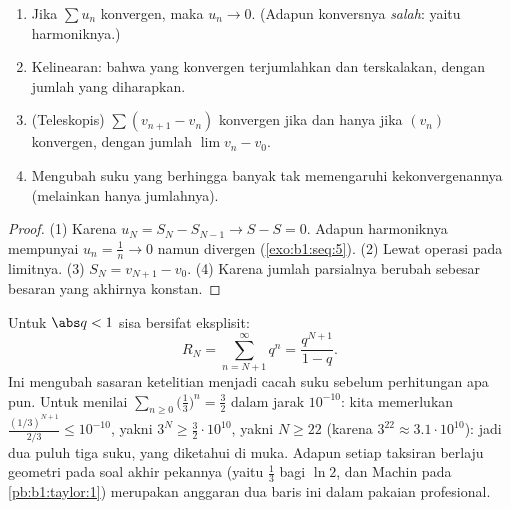 \begin{proposition}\label{prop:b1:series:first}
\begin{enumerate}
  \item Jika $\sum u_n$ konvergen, maka $u_n \to 0$. (Adapun konversnya
        \emph{salah}: yaitu  harmoniknya.)
  \item Kelinearan: bahwa  yang konvergen terjumlahkan dan terskalakan, dengan
        jumlah yang diharapkan.
  \item (Teleskopis) $\sum (v_{n+1} -
        v_n)$ konvergen jika dan hanya jika $(v_n)$ konvergen, dengan jumlah $\lim v_n -
        v_0$.
  \item Mengubah suku yang berhingga banyak tak memengaruhi kekonvergenannya
        (melainkan hanya jumlahnya).
\end{enumerate}
\end{proposition}

\begin{proof}
(1) Karena $u_N = S_N - S_{N-1} \to S - S = 0$. Adapun  harmoniknya mempunyai
$u_n = \frac1n \to 0$ namun divergen (\cref{exo:b1:seq:5}). (2)
Lewat operasi pada limitnya. (3) $S_N = v_{N+1} - v_0$. (4) Karena jumlah
parsialnya berubah sebesar besaran yang akhirnya konstan.
\end{proof}

\begin{example}\label{ex:b1:series:georemainder}
Untuk $\abs q < 1$ sisa  bersifat
eksplisit:
\[
R_N = \sum_{n = N+1}^{\infty} q^n = \frac{q^{N+1}}{1 - q} .
\]
Ini mengubah sasaran ketelitian menjadi cacah suku sebelum perhitungan
apa pun. Untuk menilai $\sum_{n\geq0} \bigl(\frac13\bigr)^n =
\frac32$ dalam jarak $10^{-10}$: kita memerlukan $\frac{(1/3)^{N+1}}{2/3} \leq
10^{-10}$, yakni $3^{N} \geq \frac{3}{2}\cdot 10^{10}$, yakni $N
\geq 22$ (karena $3^{22} \approx 3.1\cdot10^{10}$): jadi dua puluh tiga
suku, yang diketahui di muka. Adapun setiap taksiran berlaju geometri pada
soal akhir pekannya (yaitu  $\frac13$ bagi $\ln 2$, dan
 Machin pada \cref{pb:b1:taylor:1}) merupakan anggaran dua baris
ini dalam pakaian profesional.
\end{example}

